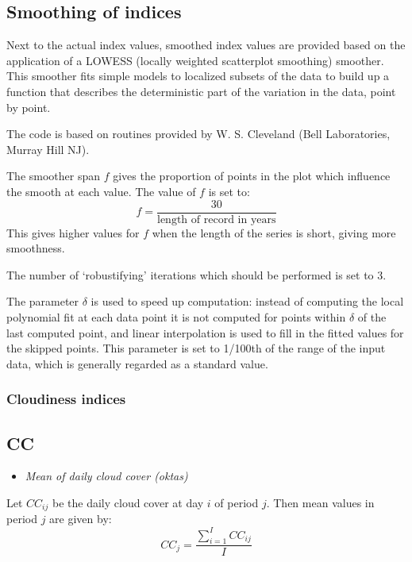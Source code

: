 \documentclass[a4paper,11pt]{article}
\begin{document}
\subsection{Smoothing of indices}
Next to the actual index values, smoothed index values are provided based on the application of a LOWESS 
(locally weighted scatterplot smoothing) smoother. This smoother fits simple models to localized subsets 
of the data to build up a function that describes the deterministic part of the variation in the data, point by point.

The code is based on routines provided by W. S. Cleveland (Bell Laboratories, Murray Hill NJ).

The smoother span $f$ gives the proportion of points in the plot which influence
the smooth at each value. The value of $f$ is set to:
\begin{equation*}
f = {\frac{30}{\text{length of record in years}}}
\end{equation*}
This gives higher values for $f$ when the length of the series is short, giving more smoothness.

The number of `robustifying' iterations which should be performed is set to 3.

The parameter $\delta$ is used to speed up computation: instead of computing the local polynomial fit at each data
point it is not computed for points within $\delta$ of the last computed point, and linear interpolation
is used to fill in the fitted values for the skipped points.
This parameter is set to 1/100th of the range of the input data, which is generally regarded as a standard value.

\subsubsection{Cloudiness indices}

\subsection*{CC}
\begin{itemize}
\item \textit{Mean of daily cloud cover (oktas)}
\end{itemize}
Let $CC_{ij}$ be the daily cloud cover at day $i$ of period
$j$. Then mean values in period $j$ are given by:
\begin{equation*}
CC_{j} = \frac{\sum_{i=1}^{I} CC_{ij}}{I}
\end{equation*}
\end{document}
